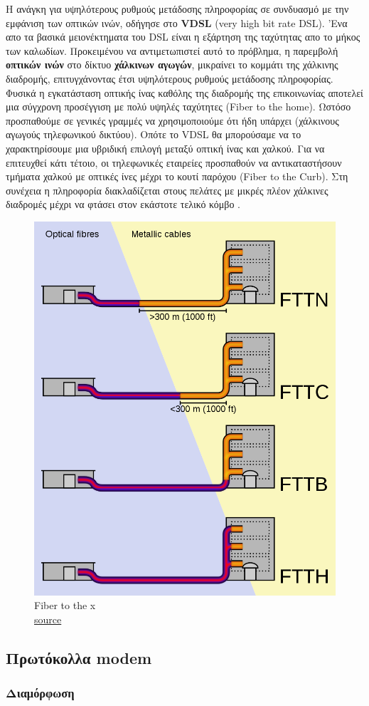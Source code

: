 \documentclass[hidelinks, 12pt, a4paper]{article}
\begin{document}
Η ανάγκη για υψηλότερους ρυθμούς μετάδοσης πληροφορίας σε συνδυασμό με την εμφάνιση των οπτικών ινών, οδήγησε στο \textbf{VDSL} (very high bit rate DSL). 'Ενα απο τα βασικά μειονέκτηματα του DSL είναι η εξάρτηση της ταχύτητας απο το μήκος των καλωδίων. Προκειμένου να αντιμετωπιστεί αυτό το πρόβλημα, η παρεμβολή \textbf{οπτικών ινών} στο δίκτυο \textbf{χάλκινων αγωγών}, μικραίνει το κομμάτι της χάλκινης διαδρομής, επιτυγχάνοντας έτσι υψηλότερους ρυθμούς μετάδοσης πληροφορίας. Φυσικά η εγκατάσταση οπτικής ίνας καθόλης της διαδρομής της επικοινωνίας αποτελεί μια σύγχρονη προσέγγιση με πολύ υψηλές ταχύτητες (Fiber to the home). Ωστόσο προσπαθούμε σε γενικές γραμμές να χρησιμοποιούμε ότι ήδη υπάρχει (χάλκινους αγωγούς τηλεφωνικού δικτύου). Οπότε το VDSL θα μπορούσαμε να το χαρακτηρίσουμε μια υβριδική επιλογή μεταξύ οπτική ίνας και χαλκού. Για να επιτευχθεί κάτι τέτοιο, οι τηλεφωνικές εταιρείες προσπαθούν να αντικαταστήσουν τμήματα χαλκού με οπτικές ίνες μέχρι το κουτί παρόχου (Fiber to the Curb). Στη συνέχεια η πληροφορία διακλαδίζεται στους πελάτες με μικρές πλέον χάλκινες διαδρομές μέχρι να φτάσει στον εκάστοτε τελικό κόμβο \cite{vdsl}.

\begin{figure}[h!]
\centering
	\includegraphics[keepaspectratio, width=.5\textwidth]{assets/fftx.png}
    \caption{Fiber to the x \\ \href{https://en.wikipedia.org/wiki/Fiber_to_the_x}{source}}
\end{figure}

\subsection{Πρωτόκολλα modem}

\subsubsection{Διαμόρφωση}
\end{document}
